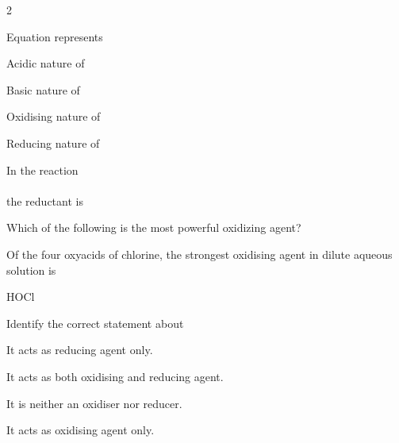 \documentclass[10pt,a4paper]{article}
\begin{document}
\begin{multicols}{2}
\begin{questions}[start=1]
\item Equation  represents
\begin{options}
  \item Acidic nature of 
  \item Basic nature of 
  \item Oxidising nature of 
  \item Reducing nature of 
\end{options}

\item In the reaction\\
\\
the reductant is
\begin{options}
  \item {}
  \item {}
  \item {}
  \item {}
\end{options}

\item Which of the following is the most powerful oxidizing agent?
\begin{options}
  \item {}
  \item {}
  \item {}
  \item {}
\end{options}

\item Of the four oxyacids of chlorine, the strongest oxidising agent in dilute aqueous solution is
\begin{options}
  \item {}
  \item {}
  \item {}
  \item HOCl
\end{options}

\item Identify the correct statement about 
\begin{options}
  \item It acts as reducing agent only.
  \item It acts as both oxidising and reducing agent.
  \item It is neither an oxidiser nor reducer.
  \item It acts as oxidising agent only.
\end{options}


\end{questions}
\end{multicols}
\end{document}
